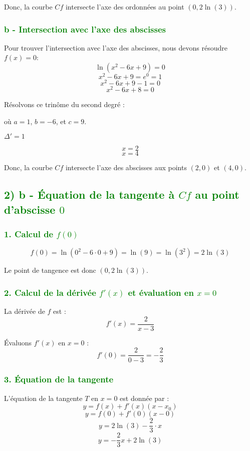 \documentclass[12pt]{article}
\begin{document}
Donc, la courbe \( Cf \) intersecte l'axe des ordonnées au point \((0, 2\ln(3))\).

\subsubsection*{\textcolor{green}{b - Intersection avec l'axe des abscisses}}

Pour trouver l'intersection avec l'axe des abscisses, nous devons résoudre \( f(x) = 0 \):
\[
\ln(x^{2}-6x+9) = 0
\]
\[
x^{2}-6x+9 = e^0 = 1
\]
\[
x^{2}-6x+9 - 1 = 0
\]
\[
x^{2}-6x+8 = 0
\]

Résolvons ce trinôme du second degré :

où \( a = 1 \), \( b = -6 \), et \( c = 9 \).

\( \Delta' = 1\)

\[
x = 2
\]
\[
x = 4
\]

Donc, la courbe \( Cf \) intersecte l'axe des abscisses aux points \((2, 0)\) et \((4, 0)\).

\subsection*{\textcolor{green}{2) b - Équation de la tangente à \( Cf \) au point d'abscisse \( 0 \)}}

\subsubsection*{\textcolor{green}{1. Calcul de \( f(0) \)}}
\[
f(0) = \ln(0^2 - 6 \cdot 0 + 9) = \ln(9) = \ln(3^2) = 2 \ln(3)
\]

Le point de tangence est donc \((0, 2 \ln(3))\).

\subsubsection*{\textcolor{green}{2. Calcul de la dérivée \( f'(x) \) et évaluation en \( x = 0 \)}}
La dérivée de \( f \) est :
\[
f'(x) = \frac{2}{x-3}
\]

Évaluons \( f'(x) \) en \( x = 0 \) :
\[
f'(0) = \frac{2}{0 - 3} = -\frac{2}{3}
\]

\subsubsection*{\textcolor{green}{3. Équation de la tangente}}
L'équation de la tangente \( T \) en \( x = 0 \) est donnée par :
\[
y = f(x) + f'(x)(x - x_{0})
\]
\[
y = f(0) + f'(0)(x - 0)
\]
\[
y = 2 \ln(3) - \frac{2}{3} \cdot x
\]
\[
y = - \frac{2}{3} x + 2 \ln(3)
\]
\end{document}
